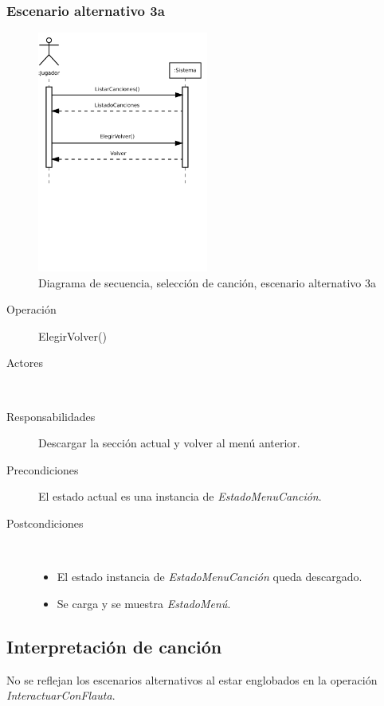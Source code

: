 \subsubsection{Escenario alternativo 3a}
\begin{figure}[h!]
  \centering
  \includegraphics[trim=0cm 12cm 0cm 0cm, clip=true, width=0.5\textwidth]{4_analisis/diagsec_caso2_esc2}
  \caption{Diagrama de secuencia, selección de canción, escenario alternativo 3a}
\end{figure}
\begin{description}
\item[Operación] ElegirVolver()
\item[Actores] \jugador\, \sistema\
\item[Responsabilidades] Descargar la sección actual y volver al menú anterior.
\item[Precondiciones] El estado actual es una instancia de \textit{EstadoMenuCanción}.
\item[Postcondiciones] $\quad$
  \begin{itemize}
  \item El estado instancia de \textit{EstadoMenuCanción} queda descargado.
  \item Se carga y se muestra \textit{EstadoMenú}.
  \end{itemize}
\end{description}

\subsection{Interpretación de canción}
\begin{nota}
  No se reflejan los escenarios alternativos al estar englobados en la operación
  \textit{InteractuarConFlauta}.
\end{nota}

